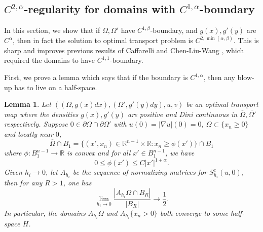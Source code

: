 \documentclass[12pt,reqno]{amsart}
\newtheorem{lem}{Lemma}[section]
\numberwithin{equation}{section}
\begin{document}
\subsection{$C^{2, \alpha}$-regularity for domains with $C^{1, \alpha}$-boundary}
        In this section, we show that if $\Omega, \Omega'$ have $C^{1, \beta}$-boundary, and $g(x), g'(y)$ are $C^{\alpha}$, then in fact the solution to optimal transport problem is $C^{2, \min(\alpha, \beta)}$. This is sharp and improves previous results of Caffarelli \cite{Caffarelli3} and Chen-Liu-Wang \cite{Chen-Liu-Wang}, which required the domains to have $C^{1, 1}$-boundary. 

        First, we prove a lemma which says that if the boundary is $C^{1, \alpha}$, then any blow-up has to live on a half-space. 
        \begin{lem}\label{lem: blow-up-is-half-space}
	Let $((\Omega, g(x)dx), (\Omega', g'(y)dy), u, v)$ be an optimal transport map where the densities $g(x), g'(y)$ are positive and Dini continuous in $\overline\Omega, \overline{\Omega'}$ respectively. 
    Suppose $0\in\partial\Omega\cap\partial\Omega'$ with $u(0) = |\nabla u|(0) = 0$,  $\Omega\subset \{x_n\geq 0\}$ and locally near $0$,
    \[\overline\Omega\cap B_1 =  \{(x', x_n)\in \mathbb R^{n-1}\times \mathbb R: x_n\geq \phi(x')\}\cap B_1\]
    where $\phi:B_1^{n-1}\to \mathbb R$ is convex and for all $x'\in B_{1}^{n-1}$, we have
	\[0\leq\phi(x')\leq C|x'|^{1+\alpha}.\]
	Given $h_i\to 0$, let $A_{h_i}$ be the sequence of normalizing matrices for $S_{h_i}^c(u, 0)$, then for any $R>1$, one has
	\[\lim_{h_i\to 0}\frac{|A_{h_i}\Omega\cap B_R|}{|B_R|} \to \frac 1 2.\]
    In particular, the domains $A_{h_i}\Omega$ and $A_{h_i}\{x_n> 0\}$ both converge to some half-space $H$. 
    \end{lem}
\end{document}
